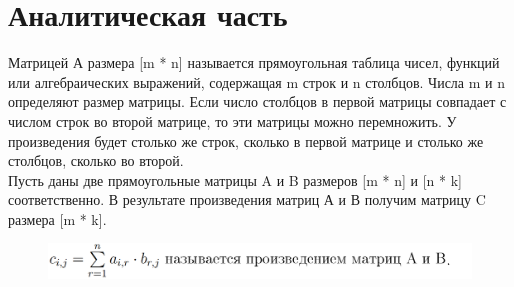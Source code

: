 \documentclass[a4paper, 12pt]{article}
\begin{document}
\section{Аналитическая часть}
\begin{flushleft}
	\hspace*{5mm} Матрицей А размера [m * n] называется прямоугольная таблица чисел, функций или алгебраических выражений, содержащая m строк и n столбцов. Числа m и n определяют размер матрицы. Если число столбцов в первой матрицы совпадает с числом строк во второй матрице, то эти матрицы можно перемножить. У произведения будет столько же строк, сколько в первой матрице и столько же столбцов, сколько во второй.
	\\ \hspace*{5mm} Пусть даны две прямоугольные матрицы A и B размеров [m * n] и [n * k] соответственно. В результате произведения матриц А и В получим матрицу C размера [m * k].\cite{mul}
	\begin{figure}[h]
		\hspace{5mm}
		\includegraphics[scale=0.8]{formula1}
	\end{figure} 

\end{flushleft}
\end{document}
